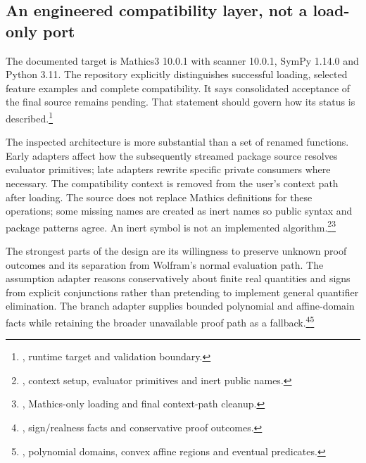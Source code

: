 \documentclass[11pt,letterpaper]{article}
\newcommand{\code}[1]{\texttt{\detokenize{#1}}}
\newcommand{\src}[2]{\footnote{\cite{#1}, #2.}}
\begin{document}
\subsection{An engineered compatibility layer, not a load-only port}

The documented target is Mathics3 10.0.1 with scanner 10.0.1, SymPy 1.14.0 and Python 3.11. The repository explicitly distinguishes successful loading, selected feature examples and complete compatibility. It says consolidated acceptance of the final source remains pending. That statement should govern how its status is described.\src{compat}{runtime target and validation boundary}

The inspected architecture is more substantial than a set of renamed functions. Early adapters affect how the subsequently streamed package source resolves evaluator primitives; late adapters rewrite specific private consumers where necessary. The compatibility context is removed from the user's context path after loading. The source does not replace Mathics \code{System} definitions for these operations; some missing \code{System} names are created as inert names so public syntax and package patterns agree. An inert symbol is not an implemented algorithm.\src{mcompat}{context setup, evaluator primitives and inert public names}\src{core}{Mathics-only loading and final context-path cleanup}

The strongest parts of the design are its willingness to preserve unknown proof outcomes and its separation from Wolfram's normal evaluation path. The assumption adapter reasons conservatively about finite real quantities and signs from explicit conjunctions rather than pretending to implement general quantifier elimination. The branch adapter supplies bounded polynomial and affine-domain facts while retaining the broader unavailable proof path as a fallback.\src{massumptions}{sign/realness facts and conservative proof outcomes}\src{mbranches}{polynomial domains, convex affine regions and eventual predicates}
\end{document}
